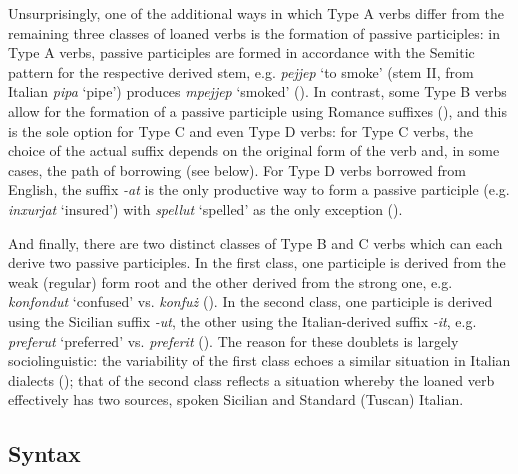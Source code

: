 \documentclass[output=paper]{langsci/langscibook}
\begin{document}
\label{participles} %
Unsurprisingly, one of the additional ways in which Type A verbs differ from the remaining three classes of loaned verbs is the formation of passive participles: in Type A verbs, passive participles are formed in accordance with the Semitic pattern for the respective derived stem, e.g. \textit{pejjep} `to smoke' (stem II, from Italian \textit{pipa} `pipe') produces \textit{mpejjep} `smoked' (\citealt[70]{mifsudloanverbs}). In contrast, some Type B verbs allow for the formation of a passive participle using Romance suffixes (\citealt[127--133]{mifsudloanverbs}), and this is the sole option for Type C and even Type D verbs: for Type C verbs, the choice of the actual suffix depends on the original form of the verb and, in some cases, the path of borrowing (see below). For Type D verbs borrowed from English, the suffix \textit{-at} is the only productive way to form a passive participle (e.g. \textit{inxurjat} `insured') with \textit{spellut} `spelled' as the only exception (\citealt[248]{mifsudloanverbs}).

And finally, there are two distinct classes of Type B and C verbs which can each derive two passive participles. In the first class, one participle is derived from the weak (regular) form root and the other derived from the strong one, e.g. \textit{konfondut} `confused' vs. \textit{konfuż} (\citealt[134]{mifsudloanverbs}). In the second class, one participle is derived using the Sicilian suffix \textit{-ut}, the other using the Italian-derived suffix \textit{-it}, e.g. \textit{preferut} `preferred' vs. \textit{preferit} (\citealt[230]{mifsudloanverbs}). The reason for these doublets is largely sociolinguistic: the variability of the first class echoes a similar situation in Italian dialects (\citealt[134]{mifsudloanverbs}); that of the second class reflects a situation whereby the loaned verb effectively has two sources, spoken Sicilian and Standard (Tuscan) Italian.
\subsection{Syntax}
\end{document}
